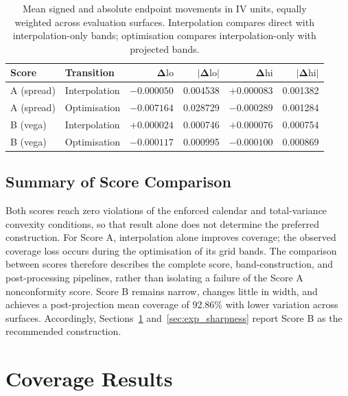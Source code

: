\begin{table}[H]
\centering
\small
\begin{tabular}{|l|l|r|r|r|r|}
\hline
\textbf{Score} & \textbf{Transition} & $\boldsymbol{\Delta\mathrm{lo}}$ & $\boldsymbol{|\Delta\mathrm{lo}|}$ & $\boldsymbol{\Delta\mathrm{hi}}$ & $\boldsymbol{|\Delta\mathrm{hi}|}$ \\
\hline
A (spread) & Interpolation & $-0.000050$ & 0.004538 & $+0.000083$ & 0.001382 \\
A (spread) & Optimisation  & $-0.007164$ & 0.028729 & $-0.000289$ & 0.001284 \\
\hline
B (vega)   & Interpolation & $+0.000024$ & 0.000746 & $+0.000076$ & 0.000754 \\
B (vega)   & Optimisation  & $-0.000117$ & 0.000995 & $-0.000100$ & 0.000869 \\
\hline
\end{tabular}
\caption{Mean signed and absolute endpoint movements in IV units, equally weighted across evaluation surfaces. Interpolation compares direct with interpolation-only bands; optimisation compares interpolation-only with projected bands.}
\label{tab:projection_endpoint_shifts}
\end{table}

\subsection{Summary of Score Comparison}
\label{subsec:ablation_summary}

Both scores reach zero violations of the enforced calendar and total-variance convexity conditions, so that result alone does not determine the preferred construction. For Score A, interpolation alone improves coverage; the observed coverage loss occurs during the optimisation of its grid bands. The comparison between scores therefore describes the complete score, band-construction, and post-processing pipelines, rather than isolating a failure of the Score A nonconformity score. Score B remains narrow, changes little in width, and achieves a post-projection mean coverage of 92.86\% with lower variation across surfaces. Accordingly, Sections~\ref{sec:exp_coverage} and~\ref{sec:exp_sharpness} report Score B as the recommended construction.

\section{Coverage Results}
\label{sec:exp_coverage}

